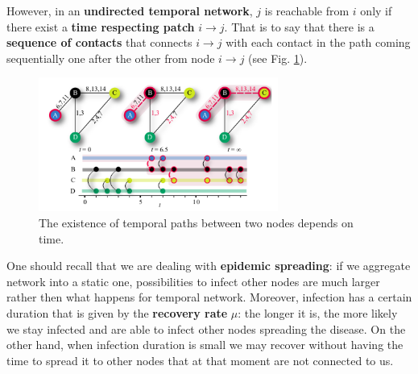 \documentclass[../main/main.tex]{subfiles}
\begin{document}
However, in an \textbf{undirected temporal network}, $j$ is reachable from $i$ only if there exist a \textbf{time respecting patch} $i \to j$. That is to say that there is a \textbf{sequence of contacts} that connects $i \to j$ with each contact in the path coming sequentially one after the other from node $i\to j$ (see Fig. \ref{fig:17_06}).

\begin{figure}[h!]
\centering
\includegraphics[width=0.7\textwidth]{../lessons/image/17/image06.png}
\caption{\label{fig:17_06} The existence of temporal paths between two nodes depends on time. }
\end{figure}


\begin{figure}[h!]
\begin{minipage}[c]{0.5\linewidth}
\end{minipage}
\begin{minipage}[]{0.5\linewidth}
\centering
{}
\end{minipage}
\caption{\label{fig:} }
\end{figure}


One should recall that we are dealing with \textbf{epidemic spreading}: if we aggregate network into a static one, possibilities to infect other nodes are much larger rather then what happens for temporal network.  Moreover, infection has a certain duration that is given by the \textbf{recovery rate} $\mu$: the longer it is, the more likely we stay infected and are able to infect other nodes spreading the disease. On the other hand, when infection duration is small we may recover without having the time to spread it to other nodes that at that moment are not connected to us.
\end{document}
